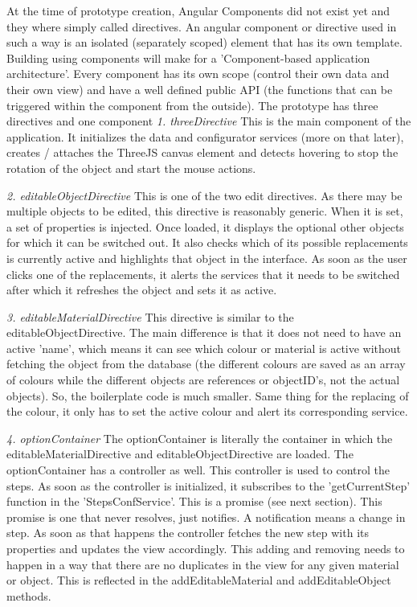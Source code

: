At the time of prototype creation, Angular Components did not exist yet and they where simply called directives. An angular component or directive used in such a way is an isolated (separately scoped) element that has its own template. Building using components will make for a 'Component-based application architecture'. Every component has its own scope (control their own data and their own view) and have a well defined public API (the functions that can be triggered within the component from the outside). 
The prototype has three directives and one component
\newline
\textit{1. threeDirective} \newline
This is the main component of the application. It initializes the data and configurator services (more on that later), creates / attaches the ThreeJS canvas element and detects hovering to stop the rotation of the object and start the mouse actions.

\textit{2. editableObjectDirective} \newline
This is one of the two edit directives. As there may be multiple objects to be edited, this directive is reasonably generic. When it is set, a set of properties is injected. Once loaded, it displays the optional other objects for which it can be switched out. It also checks which of its possible replacements is currently active and highlights that object in the interface. As soon as the user clicks one of the replacements, it alerts the services that it needs to be switched after which it refreshes the object and sets it as active.

\textit{3. editableMaterialDirective} \newline
This directive is similar to the editableObjectDirective. The main difference is that it does not need to have an active 'name', which means it can see which colour or material is active without fetching the object from the database (the different colours are saved as an array of colours while the different objects are references or objectID's, not the actual objects). So, the boilerplate code is much smaller. Same thing for the replacing of the colour, it only has to set the active colour and alert its corresponding service.

\textit{4. optionContainer} \newline
The optionContainer is literally the container in which the editableMaterialDirective and editableObjectDirective are loaded. The optionContainer has a controller as well. This controller is used to control the steps. As soon as the controller is initialized, it subscribes to the 'getCurrentStep' function in the 'StepsConfService'. This is a promise (see next section). This promise is one that never resolves, just notifies. A notification means a change in step. As soon as that happens the controller fetches the new step with its properties and updates the view accordingly. This adding and removing needs to happen in a way that there are no duplicates in the view for any given material or object. This is reflected in the addEditableMaterial and addEditableObject methods.

